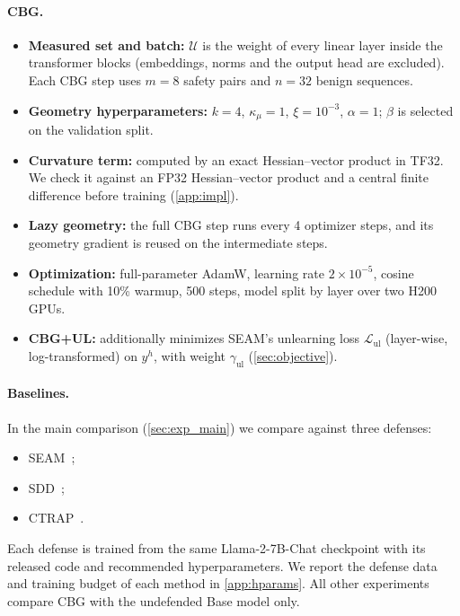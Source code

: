 \documentclass[11pt]{article}
\newcommand{\U}{\mathcal{U}}
\begin{document}
\paragraph{CBG.}
\begin{itemize}
  \item \textbf{Measured set and batch:} $\U$ is the weight of every linear layer inside the transformer blocks (embeddings, norms and the output head are excluded). Each CBG step uses $m=8$ safety pairs and $n=32$ benign sequences.
  \item \textbf{Geometry hyperparameters:} $k=4$, $\kappa_\mu=1$, $\xi=10^{-3}$, $\alpha=1$; $\beta$ is selected on the validation split.
  \item \textbf{Curvature term:} computed by an exact Hessian--vector product in TF32. We check it against an FP32 Hessian--vector product and a central finite difference before training (\cref{app:impl}).
  \item \textbf{Lazy geometry:} the full CBG step runs every 4 optimizer steps, and its geometry gradient is reused on the intermediate steps.
  \item \textbf{Optimization:} full-parameter AdamW, learning rate $2\times10^{-5}$, cosine schedule with 10\% warmup, 500 steps, model split by layer over two H200 GPUs.
  \item \textbf{CBG+UL:} additionally minimizes SEAM's unlearning loss $\mathcal L_{\mathrm{ul}}$ (layer-wise, log-transformed) on $y^h$, with weight $\gamma_{\mathrm{ul}}$ (\cref{sec:objective}).
\end{itemize}

\paragraph{Baselines.}
In the main comparison (\cref{sec:exp_main}) we compare against three defenses:
\begin{itemize}
  \item SEAM~\citep{wang2026seam};
  \item SDD~\citep{chen2025sdd};
  \item CTRAP~\citep{yi2025ctrap}.
\end{itemize}
Each defense is trained from the same Llama-2-7B-Chat checkpoint with its released code and recommended hyperparameters. We report the defense data and training budget of each method in \cref{app:hparams}. All other experiments compare CBG with the undefended Base model only.
\end{document}
